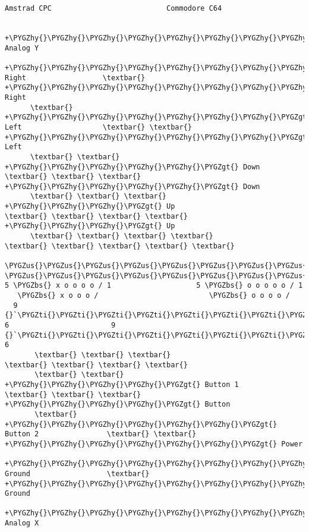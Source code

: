 \documentclass[a4paper,8pt,english]{sphinxmanual}
\def\PYGZbs{\char`\\}
\def\PYGZus{\char`\_}
\def\PYGZgt{\char`\>}
\def\PYGZhy{\char`\-}
\def\PYGZsq{\char`\'}
\def\PYGZti{\char`\~}
\renewcommand\PYGZsq{\textquotesingle}
\begin{document}
\begin{Verbatim}[commandchars=\\\{\}]
        Amstrad CPC                           Commodore C64

                                         +\PYGZhy{}\PYGZhy{}\PYGZhy{}\PYGZhy{}\PYGZhy{}\PYGZhy{}\PYGZhy{}\PYGZhy{}\PYGZhy{}\PYGZhy{}\PYGZhy{}\PYGZgt{} Analog Y
      +\PYGZhy{}\PYGZhy{}\PYGZhy{}\PYGZhy{}\PYGZhy{}\PYGZhy{}\PYGZhy{}\PYGZhy{}\PYGZhy{}\PYGZgt{} Right                  \textbar{} +\PYGZhy{}\PYGZhy{}\PYGZhy{}\PYGZhy{}\PYGZhy{}\PYGZhy{}\PYGZhy{}\PYGZhy{}\PYGZhy{}\PYGZgt{} Right
      \textbar{} +\PYGZhy{}\PYGZhy{}\PYGZhy{}\PYGZhy{}\PYGZhy{}\PYGZhy{}\PYGZhy{}\PYGZgt{} Left                   \textbar{} \textbar{} +\PYGZhy{}\PYGZhy{}\PYGZhy{}\PYGZhy{}\PYGZhy{}\PYGZhy{}\PYGZhy{}\PYGZgt{} Left
      \textbar{} \textbar{} +\PYGZhy{}\PYGZhy{}\PYGZhy{}\PYGZhy{}\PYGZhy{}\PYGZgt{} Down                   \textbar{} \textbar{} \textbar{} +\PYGZhy{}\PYGZhy{}\PYGZhy{}\PYGZhy{}\PYGZhy{}\PYGZgt{} Down
      \textbar{} \textbar{} \textbar{} +\PYGZhy{}\PYGZhy{}\PYGZhy{}\PYGZgt{} Up                     \textbar{} \textbar{} \textbar{} \textbar{} +\PYGZhy{}\PYGZhy{}\PYGZhy{}\PYGZgt{} Up
      \textbar{} \textbar{} \textbar{} \textbar{}                            \textbar{} \textbar{} \textbar{} \textbar{} \textbar{}
  \PYGZus{}\PYGZus{}\PYGZus{}\PYGZus{}\PYGZus{}\PYGZus{}\PYGZus{}\PYGZus{}\PYGZus{}\PYGZus{}\PYGZus{}\PYGZus{}\PYGZus{}                        \PYGZus{}\PYGZus{}\PYGZus{}\PYGZus{}\PYGZus{}\PYGZus{}\PYGZus{}\PYGZus{}\PYGZus{}\PYGZus{}\PYGZus{}\PYGZus{}\PYGZus{}
5 \PYGZbs{} x o o o o / 1                    5 \PYGZbs{} o o o o o / 1
   \PYGZbs{} x o o o /                          \PYGZbs{} o o o o /
  9 {}`\PYGZti{}\PYGZti{}\PYGZti{}\PYGZti{}\PYGZti{}\PYGZti{}\PYGZti{}\PYGZsq{} 6                        9 {}`\PYGZti{}\PYGZti{}\PYGZti{}\PYGZti{}\PYGZti{}\PYGZti{}\PYGZti{}\PYGZsq{} 6
       \textbar{} \textbar{} \textbar{}                              \textbar{} \textbar{} \textbar{} \textbar{}
       \textbar{} \textbar{} +\PYGZhy{}\PYGZhy{}\PYGZhy{}\PYGZhy{}\PYGZgt{} Button 1                \textbar{} \textbar{} \textbar{} +\PYGZhy{}\PYGZhy{}\PYGZhy{}\PYGZhy{}\PYGZgt{} Button
       \textbar{} +\PYGZhy{}\PYGZhy{}\PYGZhy{}\PYGZhy{}\PYGZhy{}\PYGZhy{}\PYGZgt{} Button 2                \textbar{} \textbar{} +\PYGZhy{}\PYGZhy{}\PYGZhy{}\PYGZhy{}\PYGZhy{}\PYGZhy{}\PYGZgt{} Power
       +\PYGZhy{}\PYGZhy{}\PYGZhy{}\PYGZhy{}\PYGZhy{}\PYGZhy{}\PYGZhy{}\PYGZhy{}\PYGZgt{} Ground                  \textbar{} +\PYGZhy{}\PYGZhy{}\PYGZhy{}\PYGZhy{}\PYGZhy{}\PYGZhy{}\PYGZhy{}\PYGZhy{}\PYGZgt{} Ground
                                          +\PYGZhy{}\PYGZhy{}\PYGZhy{}\PYGZhy{}\PYGZhy{}\PYGZhy{}\PYGZhy{}\PYGZhy{}\PYGZhy{}\PYGZhy{}\PYGZgt{} Analog X


\end{Verbatim}
\end{document}
